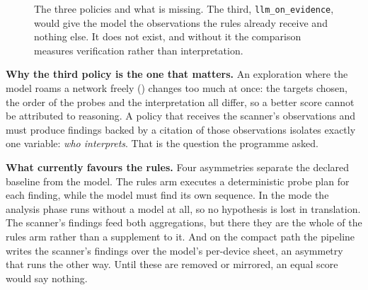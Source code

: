 \begin{figure}[H]
\centering
{}
\caption{The three policies and what is missing. The third, \texttt{llm\_on\_evidence},
would give the model the observations the rules already receive and nothing else.
It does not exist, and without it the comparison measures verification rather
than interpretation.}
\label{fig:policies}
\end{figure}

\textbf{Why the third policy is the one that matters.} An exploration where the
model roams a network freely () changes too much at once: the
targets chosen, the order of the probes and the interpretation all differ, so a
better score cannot be attributed to reasoning. A policy that receives the
scanner's observations and must produce findings backed by a citation of those
observations isolates exactly one variable: \emph{who interprets}. That is the
question the programme asked.

\textbf{What currently favours the rules.} Four asymmetries separate the declared
baseline from the model. The rules arm executes a deterministic probe plan for
each finding, while the model must find its own sequence. In the 
mode the analysis phase runs without a model at all, so no hypothesis is lost in
translation. The scanner's findings feed both aggregations, but there they are
the whole of the rules arm rather than a supplement to it. And on the compact
path the pipeline writes the scanner's findings over the model's per-device
sheet, an asymmetry that runs the other way. Until these are
removed or mirrored, an equal score would say nothing.

